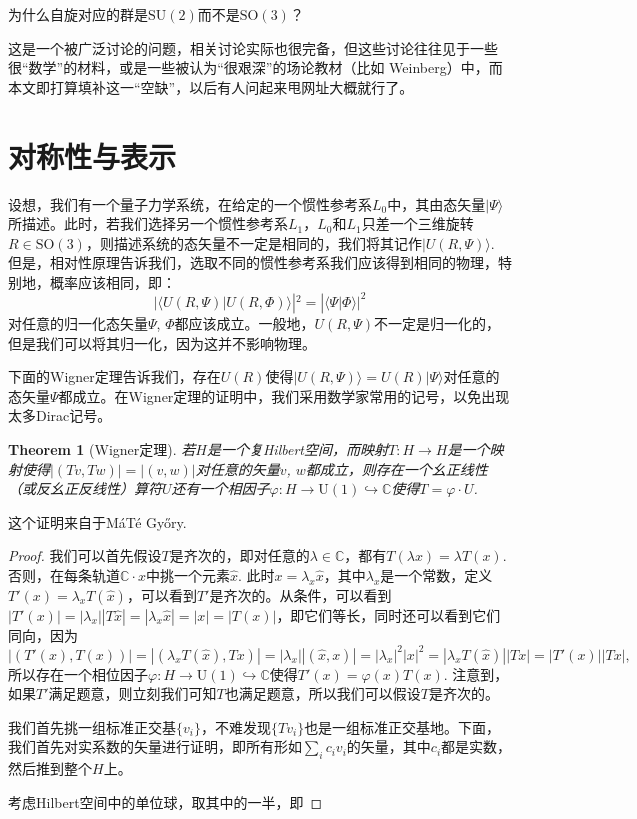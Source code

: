 \documentclass{article}
\theoremstyle{definition}
\theoremstyle{plain}
\newtheorem{thm}[para]{Theorem}
\begin{document}
	
为什么自旋对应的群是$\mathrm{SU}(2)$而不是$\mathrm{SO}(3)$？

这是一个被广泛讨论的问题，相关讨论实际也很完备，但这些讨论往往见于一些很“数学”的材料，或是一些被认为“很艰深”的场论教材（比如 Weinberg）中，而本文即打算填补这一“空缺”，以后有人问起来甩网址大概就行了。

\section{对称性与表示}

设想，我们有一个量子力学系统，在给定的一个惯性参考系$L_0$中，其由态矢量$|\Psi\rangle$所描述。此时，若我们选择另一个惯性参考系$L_1$，$L_0$和$L_1$只差一个三维旋转$R\in\mathrm{SO}(3)$，则描述系统的态矢量不一定是相同的，我们将其记作$|U(R,\Psi)\rangle$. 但是，相对性原理告诉我们，选取不同的惯性参考系我们应该得到相同的物理，特别地，概率应该相同，即：
\[
	|\langle U(R,\Psi)|U(R,\Phi)\rangle|^2=|\langle \Psi | \Phi\rangle|^2
\]
对任意的归一化态矢量$\Psi$, $\Phi$都应该成立。一般地，$U(R,\Psi)$不一定是归一化的，但是我们可以将其归一化，因为这并不影响物理。

下面的Wigner定理告诉我们，存在$U(R)$使得$|U(R,\Psi)\rangle=U(R)|\Psi\rangle$对任意的态矢量$\Psi$都成立。在Wigner定理的证明中，我们采用数学家常用的记号，以免出现太多Dirac记号。

\begin{thm}[Wigner定理]
	若$H$是一个复Hilbert空间，而映射$T:H\to H$是一个映射使得$|(Tv,Tw)|=|(v,w)|$对任意的矢量$v$, $w$都成立，则存在一个幺正线性（或反幺正反线性）算符$U$还有一个相因子$\varphi:H\to \mathrm{U}(1)\hookrightarrow \mathbb{C}$使得$T=\varphi\cdot U$.
\end{thm}

这个证明来自于MáTé Győry. 

\begin{proof}
	我们可以首先假设$T$是齐次的，即对任意的$\lambda\in \mathbb C$，都有$T(\lambda x)=\lambda T(x)$. 否则，在每条轨道$\mathbb{C}\cdot x$中挑一个元素$\hat x$. 此时$x=\lambda_x \hat x$，其中$\lambda_x$是一个常数，定义$T'(x)=\lambda_x T(\hat x)$，可以看到$T'$是齐次的。从条件，可以看到$|T'(x)|=|\lambda_x||T\hat x|=|\lambda_x \hat x|=|x|=|T(x)|$，即它们等长，同时还可以看到它们同向，因为
	\[
		|(T'(x),T(x))|=|(\lambda_x T(\hat x),Tx)|=|\lambda_x||(\hat x,x)|=|\lambda_x|^2|x|^2=|\lambda_x T(\hat x)||Tx|=|T'(x)||Tx|,
	\]
	所以存在一个相位因子$\varphi:H\to \mathrm{U}(1)\hookrightarrow \mathbb{C}$使得$T'(x)=\varphi(x)T(x)$. 注意到，如果$T'$满足题意，则立刻我们可知$T$也满足题意，所以我们可以假设$T$是齐次的。

	我们首先挑一组标准正交基$\{v_i\}$，不难发现$\{Tv_i\}$也是一组标准正交基地。下面，我们首先对实系数的矢量进行证明，即所有形如$\sum_i c_iv_i$的矢量，其中$c_i$都是实数，然后推到整个$H$上。

	考虑Hilbert空间中的单位球，取其中的一半，即
\end{proof}
\end{document}
